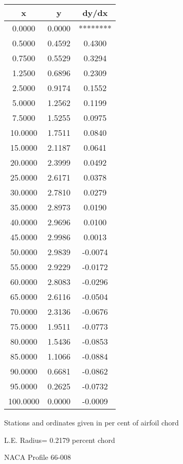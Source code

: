 \documentclass[11pt]{book}
\begin{document}
 \vspace{8mm}
 \begin{tabular}{|c|c|c|} \hline 
  x  &  y  &  dy/dx \\
 \hline
0.0000 & 0.0000 & ******** \\
0.5000 & 0.4592 & 0.4300 \\
0.7500 & 0.5529 & 0.3294 \\
1.2500 & 0.6896 & 0.2309 \\
2.5000 & 0.9174 & 0.1552 \\
5.0000 & 1.2562 & 0.1199 \\
7.5000 & 1.5255 & 0.0975 \\
10.0000 & 1.7511 & 0.0840 \\
15.0000 & 2.1187 & 0.0641 \\
20.0000 & 2.3999 & 0.0492 \\
25.0000 & 2.6171 & 0.0378 \\
30.0000 & 2.7810 & 0.0279 \\
35.0000 & 2.8973 & 0.0190 \\
40.0000 & 2.9696 & 0.0100 \\
45.0000 & 2.9986 & 0.0013 \\
50.0000 & 2.9839 & -0.0074 \\
55.0000 & 2.9229 & -0.0172 \\
60.0000 & 2.8083 & -0.0296 \\
65.0000 & 2.6116 & -0.0504 \\
70.0000 & 2.3136 & -0.0676 \\
75.0000 & 1.9511 & -0.0773 \\
80.0000 & 1.5436 & -0.0853 \\
85.0000 & 1.1066 & -0.0884 \\
90.0000 & 0.6681 & -0.0862 \\
95.0000 & 0.2625 & -0.0732 \\
100.0000 & 0.0000 & -0.0009 \\
 \hline
 \end{tabular}
 \vspace{8mm}


Stations and ordinates given in per cent of airfoil chord 


L.E. Radius=  0.2179 percent chord
 \newpage
  \label{p66-008}
 \begin{Large}
 NACA Profile 66-008
 \end{Large}
  
\end{document}
